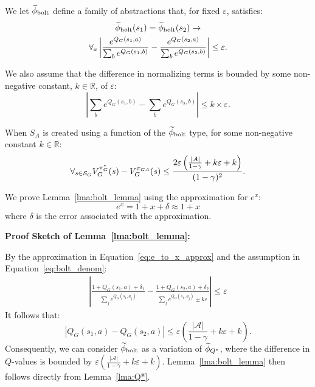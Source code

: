 \bdefn{$\epB$}
We let $\epB$ define a family of abstractions that, for fixed $\varepsilon$, satisfies:
\begin{multline}
\widetilde \phi_{\text{bolt}}(s_1) = \widetilde \phi_{\text{bolt}}(s_2) \rightarrow \\
\forall_{a} \left|\frac{e^{Q_G(s_1,a)}}{\sum_b e^{Q_G(s_1,b)}} - \frac{e^{Q_G(s_2,a)}}{\sum_b e^{Q_G(s_2,b)}}\right| \leq \varepsilon.
\label{eq:phi_bolt}
\end{multline}
\edefn

We also assume that the difference in normalizing terms is bounded by some non-negative constant, $k\in \mathbb{R}$, of $\varepsilon$:
\begin{equation}
\left| \sum_b e^{Q_G(s_1,b)} - \sum_b e^{Q_G(s_2,b)} \right| \leq k\times\varepsilon.
\label{eq:bolt_denom}
\end{equation}
\begin{lma} When $S_A$ is created using a function of the $\epB$ type, for some non-negative constant $k \in \mathbb{R}$:
\begin{equation}
\forall_{s \in \mathcal{S}_G} V_G^{\pi^*_G}(s) - V_G^{\pi_{GA}}(s) \leq \frac{2\varepsilon\left(\frac{|\mathcal{A}|}{1-\gamma} + k\varepsilon + k\right)}{(1-\gamma)^2}.
\end{equation}
\label{lma:bolt_lemma}
\end{lma}
We prove Lemma~\ref{lma:bolt_lemma} using the approximation for $e^x$:
\begin{equation}
 e^x = 1 + x + \delta  \approx 1 + x
\label{eq:e_to_x_approx}
\end{equation}
where $\delta$ is the error associated with the approximation.

{\bf Proof Sketch of Lemma~\ref{lma:bolt_lemma}:}

By the approximation in Equation~\ref{eq:e_to_x_approx} and the assumption in Equation~\ref{eq:bolt_denom}:
\begin{align*}
\left|\frac{1 + Q_G(s_1,a) + \delta_1}{\sum_j e^{Q_G(s_1,a_j)}} - \frac{1 + Q_G(s_2,a) + \delta_2}{\sum_j e^{Q_G(s_1,a_j)} \pm k\varepsilon}\right| \leq \varepsilon
\end{align*}
It follows that:
\begin{equation}
\left|Q_G(s_1,a) - Q_G(s_2,a)\right| \leq \varepsilon \left(\frac{|\mathcal{A}|}{1-\gamma} + k\varepsilon + k \right).
\label{eq:bolt_qs}
\end{equation}
Consequently, we can consider $\epB$ as a variation of $\widetilde \phi_{Q^*}$, where the difference in $Q$-values is bounded by $\varepsilon \left(\frac{|\mathcal{A}|}{1-\gamma} + k\varepsilon + k \right)$. Lemma~\ref{lma:bolt_lemma} then follows directly from Lemma~\ref{lma:Q*}.

